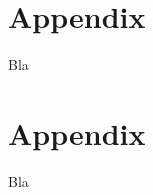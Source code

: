 \clearpage

\thesisappendix

\section{Appendix \label{A}}

Bla

\clearpage
\section{Appendix \label{B}}

Bla

